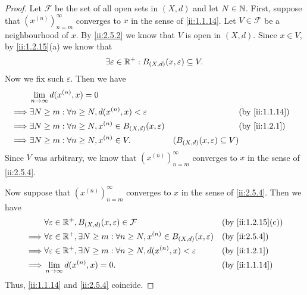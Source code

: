\begin{proof}
  Let \(\mathcal{F}\) be the set of all open sets in \((X, d)\) and let \(N \in \mathbb{N}\).
  First, suppose that \((x^{(n)})_{n = m}^\infty\) converges to \(x\) in the sense of \cref{ii:1.1.14}.
  Let \(V \in \mathcal{F}\) be a neighbourhood of \(x\).
  By \cref{ii:2.5.2} we know that \(V\) is open in \((X, d)\).
  Since \(x \in V\), by \cref{ii:1.2.15}(a) we know that
  \[
    \exists \varepsilon \in \mathbb{R}^+ : B_{(X, d)}(x, \varepsilon) \subseteq V.
  \]
  Now we fix such \(\varepsilon\).
  Then we have
  \begin{align*}
             & \lim_{n \to \infty} d(x^{(n)}, x) = 0                                                                                                   \\
    \implies & \exists N \geq m : \forall n \geq N, d(x^{(n)}, x) < \varepsilon            &                                          & \by{ii:1.1.14} \\
    \implies & \exists N \geq m : \forall n \geq N, x^{(n)} \in B_{(X, d)}(x, \varepsilon) &                                          & \by{ii:1.2.1}  \\
    \implies & \exists N \geq m : \forall n \geq N, x^{(n)} \in V.                         & (B_{(X, d)}(x, \varepsilon) \subseteq V)
  \end{align*}
  Since \(V\) was arbitrary, we know that \((x^{(n)})_{n = m}^\infty\) converges to \(x\) in the sense of \cref{ii:2.5.4}.

  Now suppose that \((x^{(n)})_{n = m}^\infty\) converges to \(x\) in the sense of \cref{ii:2.5.4}.
  Then we have
  \begin{align*}
             & \forall \varepsilon \in \R^+, B_{(X, d)}(x, \varepsilon) \in \mathcal{F}                                  &  & \by{ii:1.2.15}[c] \\
    \implies & \forall \varepsilon \in \R^+, \exists N \geq m : \forall n \geq N, x^{(n)} \in B_{(X, d)}(x, \varepsilon) &  & \by{ii:2.5.4}     \\
    \implies & \forall \varepsilon \in \R^+, \exists N \geq m : \forall n \geq N, d(x^{(n)}, x) < \varepsilon            &  & \by{ii:1.2.1}     \\
    \implies & \lim_{n \to \infty} d(x^{(n)}, x) = 0.                                                                    &  & \by{ii:1.1.14}
  \end{align*}
  Thus, \cref{ii:1.1.14} and \cref{ii:2.5.4} coincide.
\end{proof}

